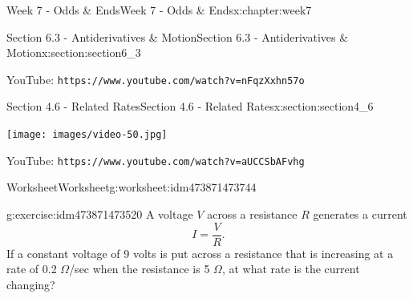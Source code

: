 \documentclass[oneside,10pt,]{book}
\newcommand{\mono}[1]{\texttt{#1}}
\numberwithin{equation}{section}
\newlength{\qrsize}
\newlength{\previewwidth}
\begin{document}
\begin{chapterptx}{Week 7 - Odds \& Ends}{}{Week 7 - Odds \& Ends}{}{}{x:chapter:week7}
\begin{sectionptx}{Section 6.3 - Antiderivatives \& Motion}{}{Section 6.3 - Antiderivatives \& Motion}{}{}{x:section:section6_3}
\begin{tcbraster}[raster columns=2, raster column skip=1pt, raster halign=center, raster force size=false, raster left skip=0pt, raster right skip=0pt]
\begin{tcolorbox}[qrstyle]
{\hypersetup{urlcolor=black}}%
\end{tcolorbox}%
\begin{tcolorbox}[captionstyle]%
\small YouTube: \mono{https://www.youtube.com/watch?v=nFqzXxhn57o}\end{tcolorbox}%
\end{tcbraster}%
\end{sectionptx}
%
%
\typeout{************************************************}
\typeout{************************************************}
%
\begin{sectionptx}{Section 4.6 - Related Rates}{}{Section 4.6 - Related Rates}{}{}{x:section:section4_6}
\setlength{\qrsize}{9em}
\setlength{\previewwidth}{\linewidth}
\addtolength{\previewwidth}{-\qrsize}
\begin{tcbraster}[raster columns=2, raster column skip=1pt, raster halign=center, raster force size=false, raster left skip=0pt, raster right skip=0pt]%
\begin{tcolorbox}[previewstyle, width=\previewwidth]%
\texttt{[image: images/video-50.jpg]}%
\end{tcolorbox}%
\begin{tcolorbox}[qrstyle]%
{\hypersetup{urlcolor=black}}%
\end{tcolorbox}%
\begin{tcolorbox}[captionstyle]%
\small YouTube: \mono{https://www.youtube.com/watch?v=aUCCSbAFvhg}\end{tcolorbox}%
\end{tcbraster}%
%
%
\typeout{************************************************}
\typeout{************************************************}
%
\begin{worksheet-subsection}{Worksheet}{}{Worksheet}{}{}{g:worksheet:idm473871473744}
\begin{divisionexercise}{1}{}{}{g:exercise:idm473871473520}%
\footnotemark{}A voltage \(V\) across a resistance \(R\) generates a current%
%
\begin{equation*}
I = \frac VR . 
\end{equation*}
If a constant voltage of \textdollar{}9\textdollar{} volts is put across a resistance that is increasing at a rate of 0.2 \(\Omega\)\slash{}sec when the resistance is 5 \(\Omega\), at what rate is the current changing?%

\end{divisionexercise}
\end{worksheet-subsection}
\end{sectionptx}
\end{chapterptx}
\end{document}
